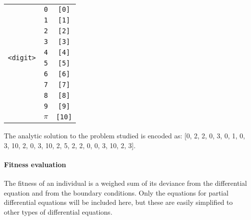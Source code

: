 \documentclass[multicolumn, 12pt]{extarticle}
\begin{document}
\begin{table}[h]
\begin{tabular}{ccc}
	\midrule
        
            \multirow{10}{*}{\texttt{<digit>}} 
            		& \multicolumn{1}{c}{\texttt{0}} & \multicolumn{1}{c}{\texttt{[0]}} \\
                                & \multicolumn{1}{c}{\texttt{1}} & \multicolumn{1}{c}{\texttt{[1]}} \\
                                & \multicolumn{1}{c}{\texttt{2}} & \multicolumn{1}{c}{\texttt{[2]}} \\
                                & \multicolumn{1}{c}{\texttt{3}} & \multicolumn{1}{c}{\texttt{[3]}} \\
                                & \multicolumn{1}{c}{\texttt{4}} & \multicolumn{1}{c}{\texttt{[4]}} \\
                                & \multicolumn{1}{c}{\texttt{5}} & \multicolumn{1}{c}{\texttt{[5]}} \\
                                & \multicolumn{1}{c}{\texttt{6}} & \multicolumn{1}{c}{\texttt{[6]}} \\
                                & \multicolumn{1}{c}{\texttt{7}} & \multicolumn{1}{c}{\texttt{[7]}} \\
                                & \multicolumn{1}{c}{\texttt{8}} & \multicolumn{1}{c}{\texttt{[8]}} \\
                                & \multicolumn{1}{c}{\texttt{9}} & \multicolumn{1}{c}{\texttt{[9]}} \\
                                & \multicolumn{1}{c}{\texttt{$\pi$}} & \multicolumn{1}{c}{\texttt{[10]}} \\
                             
        \bottomrule
        \end{tabular}
\end{table}


The analytic solution to the problem studied is encoded as: [0, 2, 2, 0, 3, 0, 1, 0, 3, 10, 2, 0, 3, 10, 2, 5, 2, 2, 0, 0, 3, 10, 2, 3]. 

\paragraph{Fitness evaluation}
The fitness of an individual is a weighed sum of its deviance from the differential equation and from the boundary conditions. Only the equations for partial differential equations will be included here, but these are easily simplified to other types of differential equations. 
\end{document}
